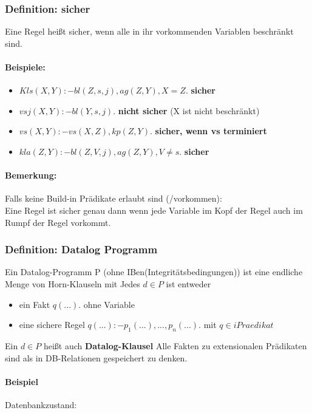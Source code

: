 \documentclass[12pt, a4paper]{article}
\begin{document}
\subsubsection*{Definition: sicher}
Eine Regel heißt sicher, wenn alle in ihr vorkommenden Variablen beschränkt sind.

\paragraph*{Beispiele:}
\begin{itemize}
\item $Kls(X,Y) :- bl(Z, s, j), ag(Z, Y), X=Z.$ \textbf{sicher}
\item $vsj(X,Y) :- bl(Y,s,j).$ \textbf{nicht sicher} (X ist nicht beschränkt)
\item $vs(X,Y) :- vs(X, Z), kp(Z, Y).$ \textbf{sicher, wenn vs terminiert}
\item $kla(Z,Y) :- bl(Z,V,j), ag(Z,Y), V \neq s.$ \textbf{sicher}
\end{itemize}

\paragraph*{Bemerkung:} Falls keine Build-in Prädikate erlaubt sind (/vorkommen):\\
Eine Regel ist sicher genau dann wenn jede Variable im Kopf der Regel auch im Rumpf der Regel vorkommt.

\subsubsection*{Definition: Datalog Programm}
Ein Datalog-Programm P (ohne IBen(Integritätsbedingungen)) ist eine endliche Menge von Horn-Klauseln mit Jedes $d \in P$ ist entweder
\begin{itemize}
\item ein Fakt $q(...).$ ohne Variable
\item eine sichere Regel $q(...) :- p_1(...),...,p_n(...).$ mit $q\in iPraedikat$
\end{itemize}

Ein $d \in P$ heißt auch \textbf{Datalog-Klausel}
Alle Fakten zu extensionalen Prädikaten sind als in DB-Relationen gespeichert zu denken.

\paragraph*{Beispiel}
Datenbankzustand:
\end{document}
